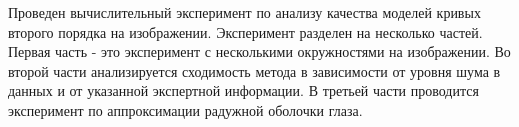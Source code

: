 Проведен вычислительный эксперимент по анализу качества моделей кривых второго порядка на изображении. Эксперимент разделен на несколько частей. Первая часть - это эксперимент с несколькими окружностями на изображении. Во второй части анализируется сходимость метода в зависимости от уровня шума в данных и от указанной экспертной информации. В третьей части проводится эксперимент по аппроксимации радужной оболочки глаза.

\begin{figure}[h!]
\center

\end{figure}
